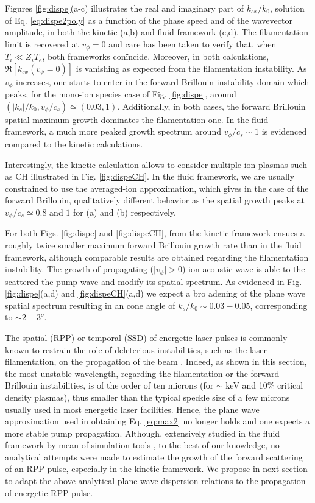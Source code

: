\documentclass[
 reprint,
 amsmath,amssymb,
 aps,
]{revtex4-1}
\begin{document}
Figures \ref{fig:dispe}(a-c)  illustrates the real and imaginary part of $k_{sx}/k_0$, solution of Eq. \eqref{eq:dispe2poly} as a function of the phase speed and of the wavevector amplitude, in both the kinetic (a,b) and fluid framework (c,d). The filamentation limit is recovered at $v_\phi=0$ and care has been taken to verify that, when $T_i\ll Z_iT_e$, both frameworks con\"incide. Moreover, in both calculations, $\Re[k_{sx}(v_\phi=0)]$ is vanishing as expected from the filamentation instability. As $v_\phi$ increases, one starts to enter in the forward Brillouin instability domain which peaks, for the mono-ion species case of Fig. \ref{fig:dispe}, around $(\vert k_s\vert/k_0, v_\phi/c_s) \simeq(0.03,1)$. Additionally, in both cases, the forward Brillouin spatial maximum  growth dominates the filamentation one. In the fluid framework, a much more peaked growth spectrum around  $ v_\phi/c_s\sim 1 $ is evidenced compared to the kinetic calculations. 

Interestingly, the kinetic calculation allows to consider multiple ion plasmas such as CH  illustrated in Fig. \ref{fig:dispeCH}. In the fluid framework, we are usually constrained to use the averaged-ion approximation, which gives in the case of the forward Brillouin, qualitatively different behavior as the spatial growth peaks at $v_\phi/c_s \simeq 0.8$ and $1$ for (a) and (b) respectively. 

For both Figs. \ref{fig:dispe} and \ref{fig:dispeCH},   from the kinetic framework ensues a  roughly twice smaller maximum forward Brillouin growth rate than in the fluid framework, although comparable results are obtained regarding the filamentation instability. 
The growth of propagating ($\vert v_\phi\vert >0$) ion acoustic wave   is able to the scattered the pump wave and modify its spatial spectrum. As evidenced in Fig. \ref{fig:dispe}(a,d) and \ref{fig:dispeCH}(a,d) we expect a bro
adening of the plane wave spatial spectrum  resulting in an cone angle of $k_s/k_0\sim 0.03-0.05$, corresponding to $\sim 2-3^o$.  

The spatial (RPP) or temporal (SSD) of energetic laser pulses is commonly known to restrain the role of deleterious instabilities, such as the laser filamentation, on the propagation of the beam \cite[]{}. Indeed, as shown in this section, the most unstable wavelength, regarding the filamentation or the forward Brillouin instabilities, is of the order of ten   microns (for $\sim$ keV and 10\% critical density plasmas), thus smaller than the typical  speckle size   of a few microns   usually used in most energetic laser facilities.  
Hence, the plane wave approximation used in obtaining Eq. \eqref{eq:max2} no longer holds and one expects a more stable pump propagation.
Although, extensively studied in the fluid framework by mean of simulation tools \cite[]{}, to the best of our knowledge, no analytical attempts were made to estimate the growth of the forward scattering of an RPP pulse, especially in the kinetic framework. 
We propose in next section to adapt the above analytical plane wave dispersion relations  to the propagation of energetic RPP pulse.
\end{document}
